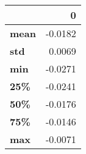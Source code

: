 \begin{tabular}{lr}
\toprule
{} &       0 \\
\midrule
\textbf{mean} & -0.0182 \\
\textbf{std } &  0.0069 \\
\textbf{min } & -0.0271 \\
\textbf{25\% } & -0.0241 \\
\textbf{50\% } & -0.0176 \\
\textbf{75\% } & -0.0146 \\
\textbf{max } & -0.0071 \\
\bottomrule
\end{tabular}
